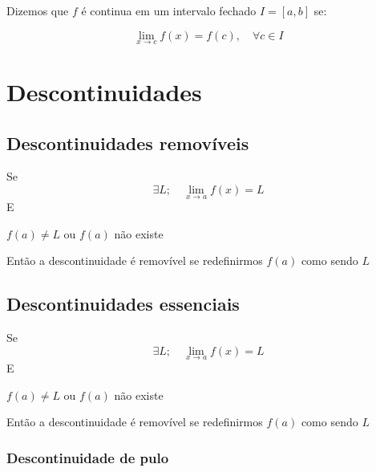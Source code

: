 \begin{definition}
    Dizemos que \(f\) é continua em um intervalo fechado \( I = [a, b]\) se:
    
    \begin{equation}
       \lim_{x \to c} f(x) = f(c),\quad \forall c \in I
    \end{equation}
    
\end{definition}


\section{Descontinuidades}

\subsection{Descontinuidades removíveis}

\begin{definition}
    Se
    \begin{equation*}
        \exists L; \quad \lim_{x \to a} f(x) = L
    \end{equation*}
    E
    \begin{center}
        \(f(a) \neq L\) ou \(f(a)\) não existe
    \end{center}
    Então a descontinuidade é removível se redefinirmos \(f(a)\) como sendo \(L\)
\end{definition}

\subsection{Descontinuidades essenciais}


\begin{definition}
    Se
    \begin{equation*}
        \exists L; \quad \lim_{x \to a} f(x) = L
    \end{equation*}
    E
    \begin{center}
        \(f(a) \neq L\) ou \(f(a)\) não existe
    \end{center}
    Então a descontinuidade é removível se redefinirmos \(f(a)\) como sendo \(L\)
\end{definition}

\subsubsection{Descontinuidade de pulo}

